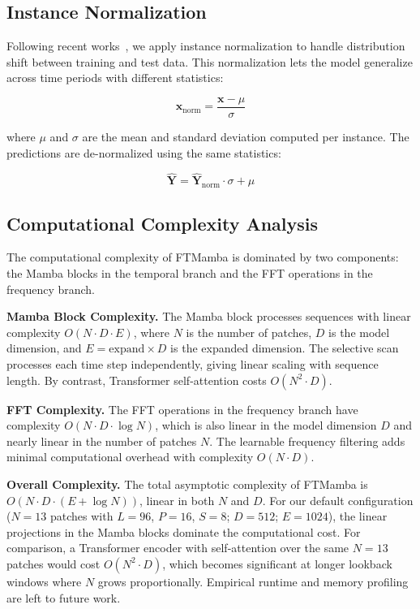 \documentclass[electronics,article,submit,pdftex,moreauthors]{Definitions/mdpi}
\begin{document}
\subsection{Instance Normalization}

Following recent works~\cite{ref8,ref9}, we apply instance normalization to handle distribution shift between training and test data. This normalization lets the model generalize across time periods with different statistics:
\begin{linenomath}
\begin{equation}
\mathbf{x}_{\text{norm}} = \frac{\mathbf{x} - \mu}{\sigma}
\end{equation}
\end{linenomath}
where $\mu$ and $\sigma$ are the mean and standard deviation computed per instance. The predictions are de-normalized using the same statistics:
\begin{linenomath}
\begin{equation}
\hat{\mathbf{Y}} = \hat{\mathbf{Y}}_{\text{norm}} \cdot \sigma + \mu
\end{equation}
\end{linenomath}

\subsection{Computational Complexity Analysis}

The computational complexity of FTMamba is dominated by two components: the Mamba blocks in the temporal branch and the FFT operations in the frequency branch.

\textbf{Mamba Block Complexity.} The Mamba block processes sequences with linear complexity $O(N \cdot D \cdot E)$, where $N$ is the number of patches, $D$ is the model dimension, and $E = \text{expand} \times D$ is the expanded dimension. The selective scan processes each time step independently, giving linear scaling with sequence length. By contrast, Transformer self-attention costs $O(N^2 \cdot D)$.

\textbf{FFT Complexity.} The FFT operations in the frequency branch have complexity $O(N \cdot D \cdot \log N)$, which is also linear in the model dimension $D$ and nearly linear in the number of patches $N$. The learnable frequency filtering adds minimal computational overhead with complexity $O(N \cdot D)$.

\textbf{Overall Complexity.} The total asymptotic complexity of FTMamba is $O(N \cdot D \cdot (E + \log N))$, linear in both $N$ and $D$. For our default configuration ($N = 13$ patches with $L = 96$, $P = 16$, $S = 8$; $D = 512$; $E = 1024$), the linear projections in the Mamba blocks dominate the computational cost. For comparison, a Transformer encoder with self-attention over the same $N=13$ patches would cost $O(N^2 \cdot D)$, which becomes significant at longer lookback windows where $N$ grows proportionally. Empirical runtime and memory profiling are left to future work.
\end{document}
